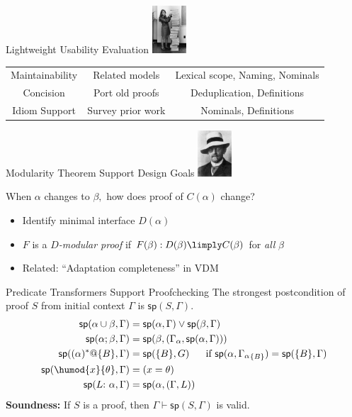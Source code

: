 \documentclass[slidestop,aspectratio=169]{beamer}
\newcommand{\G}{\Gamma}
\newcommand{\spost}[2]{\mathsf{sp}(#1,#2)}
\newcommand{\sshow}[3]{\textsf{show}~{#1}:{#2}~{#3}}
\newcommand{\shave}[4]{\textsf{have}~{#1}:{#2}~{#3}~{#4}}
\theoremstyle{plain}
\theoremstyle{definition}
\theoremstyle{remark}
\newcommand{\logician}[1][1in]{\includegraphics[width=#1]{img/hilbert.png}}
\newcommand{\logicuser}[1][1in]{\includegraphics[width=#1]{img/hamilton.png}}
\begin{document}
\begin{frame}[t,fragile]{Lightweight Usability Evaluation}
\logicuser[0.5in]

\begin{center}
\begin{tabular}{ccc}
{\color{vblue}{Goal}}            & {\color{vblue}{How Evaluated}}     & {\color{vblue}{Supporting Features}} \\\hline
Maintainability & Related models    & Lexical scope, Naming, Nominals \\ \pause
Concision       & Port old proofs   & Deduplication, Definitions\\ \pause
Idiom Support   & Survey prior work & Nominals, Definitions
\end{tabular}
\end{center}
\end{frame}

\begin{frame}[t]{Modularity Theorem Support Design Goals}
\logician[0.5in]
\begin{center}
When $\alpha$ changes to $\beta,$ how does proof of $C(\alpha)$ change?
\begin{itemize}
\item Identify minimal interface $D(\alpha)$
\item $F$ is a $D$\emph{-modular proof} if $F(\beta): D(\beta) \limply C(\beta)$ for \emph{all} $\beta$
\item Related: ``Adaptation completeness'' in VDM
\end{itemize}
\end{center}
\end{frame}

\begin{frame}[t]{Predicate Transformers Support Proofchecking}
The strongest postcondition of proof $S$ from initial context $\G$ is $\spost{S}{\G}$.
\begin{align*}
\spost{\alpha\cup\beta}{\G}                    &= \spost{\alpha}{\G} \vee \spost{\beta}{\G}   \\
\spost{\alpha;\beta}{\G}                       &= \spost{\beta}{(\G_\alpha,\spost{\alpha}{\G})}\\
  \spost{(\alpha)^*@\{B\}}{\G} &= \spost{\{B\}}{G}\ \ \ \ \ \text{if }\spost{\alpha}{{\G_\alpha}_{\{B\}}}=\spost{\{B\}}{\G}\\
\spost{\humod{x}{\theta}}{\G} &=(x=\theta) \\
\spost{L{:}\ \alpha}{\G} &= \spost{\alpha}{(\G,L)}
\end{align*}
\textbf{Soundness:} If $S$ is a proof, then $\G \vdash \spost{S}{\G}$ is valid.
\end{frame}
\end{document}
